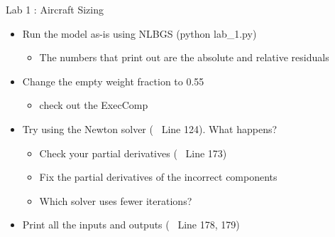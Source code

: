 \documentclass[aspectratio=169, usenames,dvipsnames, 14pt]{beamer}
\begin{document}
\begin{frame}{Lab 1 : Aircraft Sizing}
    \begin{itemize}
        \item Run the model as-is using NLBGS (python lab\_1.py)
            \begin{itemize}
                \item The numbers that print out are the absolute and relative residuals
            \end{itemize}
            
        \vspace{0.25cm}
        \item Change the empty weight fraction to 0.55 
            \begin{itemize}
                \item check out the ExecComp
            \end{itemize}
            
        \vspace{0.25cm}
        \item Try using the Newton solver (~ Line 124). What happens?
            \begin{itemize}
                \item Check your partial derivatives (~ Line 173)
                \item Fix the partial derivatives of the incorrect components
                \item Which solver uses fewer iterations?
            \end{itemize}
            
        \vspace{0.25cm}
        \item Print all the inputs and outputs (~ Line 178, 179)
    \end{itemize}
    
\end{frame}

\end{document}
